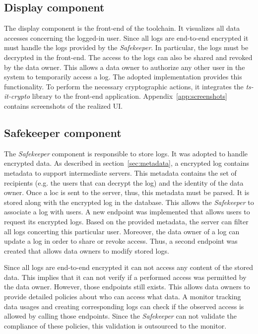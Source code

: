 \documentclass[../main.tex]{subfiles}
\begin{document}
\subsection{Display component}
The display component is the front-end of the toolchain.
It visualizes all data accesses concerning the logged-in user.
Since all logs are end-to-end encrypted it must handle the logs provided by the \textit{Safekeeper}.
In particular, the logs must be decrypted in the front-end.
The access to the logs can also be shared and revoked by the data owner.
This allows a data owner to authorize any other user in the system to temporarily access a log.
The adopted implementation provides this functionality.
To perform the necessary cryptographic actions, it integrates the \textit{ts-it-crypto} library to the front-end application.
Appendix~\ref{app:screenshots} contains screenshots of the realized UI.

\subsection{Safekeeper component}
The \textit{Safekeeper} component is responsible to store logs.
It was adopted to handle encrypted data.
As described in section~\ref{sec:metadata}, a encrypted log contains metadata to support intermediate servers.
This metadata contains the set of recipients (e.g. the users that can decrypt the log) and the identity of the data owner.
Once a loc is sent to the server, thus, this metadata must be parsed.
It is stored along with the encrypted log in the database.
This allows the \textit{Safekeeper} to associate a log with users.
A new endpoint was implemented that allows users to request its encrypted logs.
Based on the provided metadata, the server can filter all logs concerting this particular user.
Moreover, the data owner of a log can update a log in order to share or revoke access.
Thus, a second endpoint was created that allows data owners to modify stored logs.

Since all logs are end-to-end encrypted it can not access any content of the stored data.
This implies that it can not verify if a performed access was permitted by the data owner.
However, those endpoints still exists.
This allows data owners to provide detailed policies about who can access what data.
A monitor tracking data usages and creating corresponding logs can check if the observed access is allowed by calling those endpoints.
Since the \textit{Safekeeper} can not validate the compliance of these policies, this validation is outsourced to the monitor.
\end{document}
